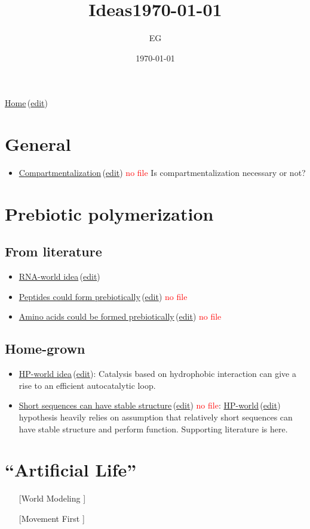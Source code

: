 \documentclass[12pt]{paper}
\title{Ideas\today}
\author{EG}
\date{\today}
\newcommand{\red}[1]{\textcolor{red}{#1}}
\newcommand{\wikilink}[2] { \href{#1.pdf}{#2}\,(\href{#1.tex}{edit})}
\begin{document}
 \maketitle
\wikilink{home}{Home}
 
\tableofcontents


\section{General}
\begin{itemize}
 \item \wikilink{compartment}{Compartmentalization} \red{no file} Is compartmentalization 
necessary or not?
\end{itemize}


\section{Prebiotic polymerization}
\subsection{From literature}
\begin{itemize}
\item \wikilink{rna\_world}{RNA-world idea}
 \item  \wikilink{peptide\_world}{Peptides could form prebiotically} \red{no file}
 \item \wikilink{prebiotic_aa}{Amino acids could be formed prebiotically} \red{no file}
\end{itemize}

\subsection{Home-grown}
\begin{itemize}
 \item \wikilink{hp\_world\_thesis}{HP-world idea}: Catalysis based on hydrophobic interaction can 
give a rise to an efficient 
autocatalytic loop.
\item \wikilink{short\_able\_sequences}{Short sequences can have stable structure} \red{no file}: 
\wikilink{hp\_world\_thesis}{HP-world}  hypothesis heavily relies on 
assumption that relatively short sequences can have stable structure and perform function. 
Supporting literature is here. 
\end{itemize}



\section{``Artificial Life''}
\begin{itemize}
 \item [[World Modeling]]
\item [[Movement First]]
\end{itemize}






  
  
\end{document}
